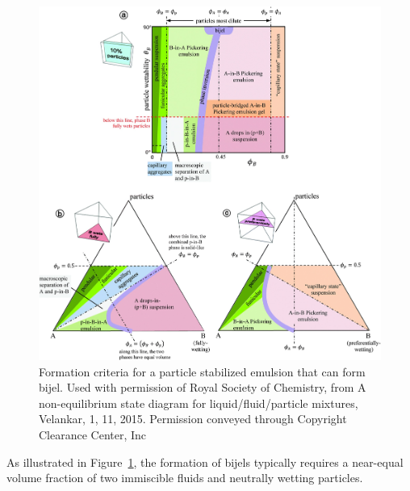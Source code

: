 \begin{figure}
    \centering
    \includegraphics[scale = 0.3]{figures/literature_review/state_diagram.jpg}
    \caption{Formation criteria for a particle stabilized emulsion that can form bijel. \cite{velankar_non-equilibrium_2015}
            Used with permission of Royal Society of Chemistry, from A non-equilibrium state diagram for liquid/fluid/particle 
            mixtures, Velankar, 1, 11, 2015. Permission conveyed through Copyright Clearance Center, Inc}
    \label{fig:state_diagram_particle_emulsions}
\end{figure}

As illustrated in Figure~\ref{fig:state_diagram_particle_emulsions}, the formation of bijels typically requires a near-equal volume fraction of two immiscible fluids and neutrally wetting 
particles. 

